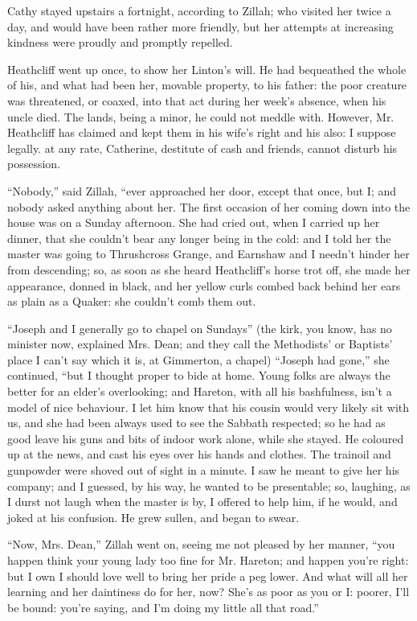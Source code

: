 \par Cathy stayed upstairs a fortnight, according to Zillah; who visited her twice a day, and would have been rather more friendly, but her attempts at increasing kindness were proudly and promptly repelled.
\par Heathcliff went up once, to show her Linton's will. He had bequeathed the whole of his, and what had been her, movable property, to his father: the poor creature was threatened, or coaxed, into that act during her week's absence, when his uncle died. The lands, being a minor, he could not meddle with. However, Mr. Heathcliff has claimed and kept them in his wife's right and his also: I suppose legally. at any rate, Catherine, destitute of cash and friends, cannot disturb his possession.
\par “Nobody,” said Zillah, “ever approached her door, except that once, but I; and nobody asked anything about her. The first occasion of her coming down into the house was on a Sunday afternoon. She had cried out, when I carried up her dinner, that she couldn't bear any longer being in the cold: and I told her the master was going to Thrushcross Grange, and Earnshaw and I needn't hinder her from descending; so, as soon as she heard Heathcliff's horse trot off, she made her appearance, donned in black, and her yellow curls combed back behind her ears as plain as a Quaker: she couldn't comb them out.
\par “Joseph and I generally go to chapel on Sundays” (the kirk, you know, has no minister now, explained Mrs. Dean; and they call the Methodists' or Baptists' place I can't say which it is, at Gimmerton, a chapel) “Joseph had gone,” she continued, “but I thought proper to bide at home. Young folks are always the better for an elder's overlooking; and Hareton, with all his bashfulness, isn't a model of nice behaviour. I let him know that his cousin would very likely sit with us, and she had been always used to see the Sabbath respected; so he had as good leave his guns and bits of indoor work alone, while she stayed. He coloured up at the news, and cast his eyes over his hands and clothes. The trainoil and gunpowder were shoved out of sight in a minute. I saw he meant to give her his company; and I guessed, by his way, he wanted to be presentable; so, laughing, as I durst not laugh when the master is by, I offered to help him, if he would, and joked at his confusion. He grew sullen, and began to swear.
\par “Now, Mrs. Dean,” Zillah went on, seeing me not pleased by her manner, “you happen think your young lady too fine for Mr. Hareton; and happen you're right: but I own I should love well to bring her pride a peg lower. And what will all her learning and her daintiness do for her, now? She's as poor as you or I: poorer, I'll be bound: you're saying, and I'm doing my little all that road.”
